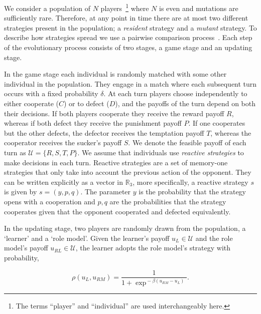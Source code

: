 \documentclass[11pt]{article}
\newcommand{\R}{\mathbb{R}}
\theoremstyle{plainCl1}
\theoremstyle{plainCl2}
\begin{document}
We consider a population of \(N\) players~\footnote{The terms ``player'' and
``individual'' are used interchangeably here.} where \(N\) is even and mutations
are sufficiently rare. Therefore, at any point in time there are at most two
different strategies present in the population; a \textit{resident} strategy and
a \textit{mutant} strategy. To describe how strategies spread we use a pairwise
comparison process~\cite{Traulsen2006}. Each step of the evolutionary process
consists of two stages, a game stage and an updating stage.

In the game stage each individual is randomly matched with some other individual
in the population. They engage in a match where each subsequent turn occurs with
a fixed probability $\delta$. At each turn players choose independently to
either cooperate (\(C\)) or to defect (\(D\)), and the payoffs of the turn
depend on both their decisions. If both players cooperate they receive the
reward payoff \(R\), whereas if both defect they receive the punishment payoff
\(P\). If one cooperates but the other defects, the defector receives the
temptation payoff \(T\), whereas the cooperator receives the sucker's payoff
\(S\). We denote the feasible payoff of each turn as \(\mathcal{U} = \{R, S, T,
P\}\). We assume that individuals use \textit{reactive strategies} to make
decisions in each turn. Reactive strategies are a set of memory-one strategies
that only take into account the previous action of the opponent. They can be
written explicitly as a vector in \(\R_{3}\), more specifically, a reactive
strategy \(s\) is given by \(s=(y, p, q)\). The parameter \(y\) is the
probability that the strategy opens with a cooperation and \(p, q\) are the
probabilities that the strategy cooperates given that the opponent cooperated
and defected equivalently.

In the updating stage, two players are randomly drawn from the population, a
`learner' and a `role model'. Given the learner's payoff $u_L\!\in\!
\mathcal{U}$ and the role model's payoff $u_{RL}\!\in\! \mathcal{U}$, the
learner adopts the role model's strategy with probability,

\begin{equation} \label{Eq:rho}
  \rho(u_{L}, u_{RM}) = \frac{1}{1\!+\! \exp^{\!-\!\beta (u_{RM}\!-\!u_{L})}}.
\end{equation}
\end{document}
